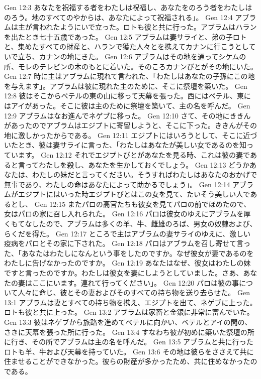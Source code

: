 Gen 12:3  あなたを祝福する者をわたしは祝福し、あなたをのろう者をわたしはのろう。地のすべてのやからは、あなたによって祝福される」。
Gen 12:4  アブラムは主が言われたようにいで立った。ロトも彼と共に行った。アブラムはハランを出たとき七十五歳であった。
Gen 12:5  アブラムは妻サライと、弟の子ロトと、集めたすべての財産と、ハランで獲た人々とを携えてカナンに行こうとしていで立ち、カナンの地にきた。
Gen 12:6  アブラムはその地を通ってシケムの所、モレのテレビンの木のもとに着いた。そのころカナンびとがその地にいた。
Gen 12:7  時に主はアブラムに現れて言われた、「わたしはあなたの子孫にこの地を与えます」。アブラムは彼に現れた主のために、そこに祭壇を築いた。
Gen 12:8  彼はそこからベテルの東の山に移って天幕を張った。西にはベテル、東にはアイがあった。そこに彼は主のために祭壇を築いて、主の名を呼んだ。
Gen 12:9  アブラムはなお進んでネゲブに移った。
Gen 12:10  さて、その地にききんがあったのでアブラムはエジプトに寄留しようと、そこに下った。ききんがその地に激しかったからである。
Gen 12:11  エジプトにはいろうとして、そこに近づいたとき、彼は妻サライに言った、「わたしはあなたが美しい女であるのを知っています。
Gen 12:12  それでエジプトびとがあなたを見る時、これは彼の妻であると言ってわたしを殺し、あなたを生かしておくでしょう。
Gen 12:13  どうかあなたは、わたしの妹だと言ってください。そうすればわたしはあなたのおかげで無事であり、わたしの命はあなたによって助かるでしょう」。
Gen 12:14  アブラムがエジプトにはいった時エジプトびとはこの女を見て、たいそう美しい人であるとし、
Gen 12:15  またパロの高官たちも彼女を見てパロの前でほめたので、女はパロの家に召し入れられた。
Gen 12:16  パロは彼女のゆえにアブラムを厚くもてなしたので、アブラムは多くの羊、牛、雌雄のろば、男女の奴隷および、らくだを得た。
Gen 12:17  ところで主はアブラムの妻サライのゆえに、激しい疫病をパロとその家に下された。
Gen 12:18  パロはアブラムを召し寄せて言った、「あなたはわたしになんという事をしたのですか。なぜ彼女が妻であるのをわたしに告げなかったのですか。
Gen 12:19  あなたはなぜ、彼女はわたしの妹ですと言ったのですか。わたしは彼女を妻にしようとしていました。さあ、あなたの妻はここにいます。連れて行ってください」。
Gen 12:20  パロは彼の事について人々に命じ、彼とその妻およびそのすべての持ち物を送り去らせた。
Gen 13:1  アブラムは妻とすべての持ち物を携え、エジプトを出て、ネゲブに上った。ロトも彼と共に上った。
Gen 13:2  アブラムは家畜と金銀に非常に富んでいた。
Gen 13:3  彼はネゲブから旅路を進めてベテルに向かい、ベテルとアイの間の、さきに天幕を張った所に行った。
Gen 13:4  すなわち彼が初めに築いた祭壇の所に行き、その所でアブラムは主の名を呼んだ。
Gen 13:5  アブラムと共に行ったロトも羊、牛および天幕を持っていた。
Gen 13:6  その地は彼らをささえて共に住ませることができなかった。彼らの財産が多かったため、共に住めなかったのである。
